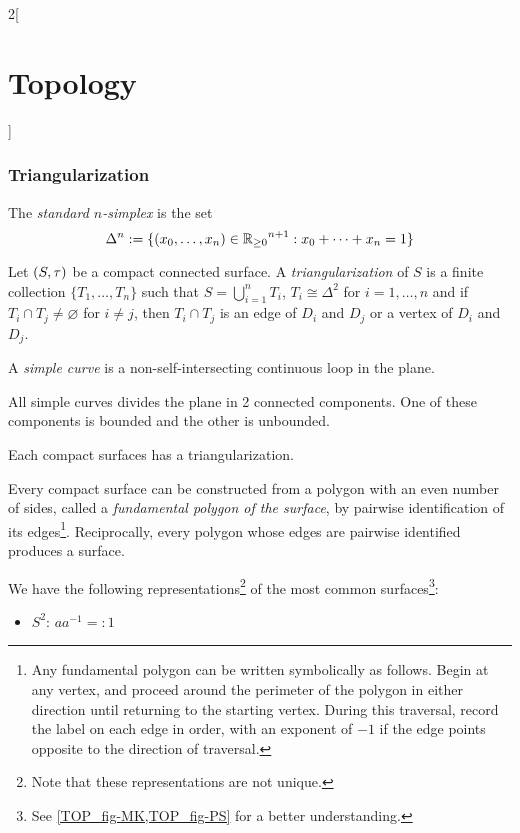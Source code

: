 \documentclass[../../../main.tex]{subfiles}
\begin{document}
\begin{multicols}{2}[\section{Topology}]
  \subsubsection{Triangularization}
  \begin{definition}
    The \emph{standard $n$-simplex} is the set $$\Delta^n:=\{(x_0,\ldots,x_n)\in{\ensuremath{\mathbb{R}}_{\geq 0}}^{n+1}:x_0+\cdots+x_n=1\}$$
  \end{definition}
  \begin{definition}
    Let $(S,\tau)$ be a compact connected surface. A \emph{triangularization} of $S$ is a finite collection $\{T_1,\ldots,T_n\}$ such that $S=\bigcup_{i=1}^nT_i$, $T_i\cong\Delta^2$ for $i=1,\ldots,n$ and if $T_i\cap T_j\ne\varnothing$ for $i\ne j$, then $T_i\cap T_j$ is an edge of $D_i$ and $D_j$ or a vertex of $D_i$ and $D_j$.
  \end{definition}
  \begin{definition}
    A \emph{simple curve} is a non-self-intersecting continuous loop in the plane.
  \end{definition}
  \begin{theorem}
    All simple curves divides the plane in 2 connected components. One of these components is bounded and the other is unbounded.
  \end{theorem}
  \begin{theorem}
    Each compact surfaces has a triangularization.
  \end{theorem}
  \begin{theorem}
    Every compact surface can be constructed from a polygon with an even number of sides, called a \emph{fundamental polygon of the surface}, by pairwise identification of its edges\footnote{Any fundamental polygon can be written symbolically as follows. Begin at any vertex, and proceed around the perimeter of the polygon in either direction until returning to the starting vertex. During this traversal, record the label on each edge in order, with an exponent of $-1$ if the edge points opposite to the direction of traversal.}. Reciprocally, every polygon whose edges are pairwise identified produces a surface.
  \end{theorem}
  \begin{proposition}
    We have the following representations\footnote{Note that these representations are not unique.} of the most common surfaces\footnote{See \cref{TOP_fig-MK,TOP_fig-PS} for a better understanding.}:
    \begin{itemize}
      \item $S^2$: $aa^{-1}=:1$

\end{itemize}
\end{proposition}
\end{multicols}
\end{document}
